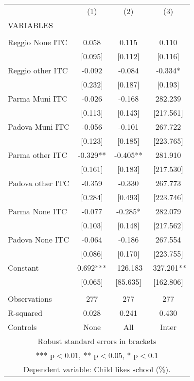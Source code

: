 \begin{tabular}{lccc} \hline
 & (1) & (2) & (3) \\
VARIABLES &  &  &  \\ \hline
 &  &  &  \\
Reggio None ITC & 0.058 & 0.115 & 0.110 \\
 & [0.095] & [0.112] & [0.116] \\
Reggio other ITC & -0.092 & -0.084 & -0.334* \\
 & [0.232] & [0.187] & [0.193] \\
Parma Muni ITC & -0.026 & -0.168 & 282.239 \\
 & [0.113] & [0.143] & [217.561] \\
Padova Muni ITC & -0.056 & -0.101 & 267.722 \\
 & [0.123] & [0.185] & [223.765] \\
Parma other ITC & -0.329** & -0.405** & 281.910 \\
 & [0.161] & [0.183] & [217.530] \\
Padova other ITC & -0.359 & -0.330 & 267.773 \\
 & [0.284] & [0.493] & [223.746] \\
Parma None ITC & -0.077 & -0.285* & 282.079 \\
 & [0.103] & [0.148] & [217.562] \\
Padova None ITC & -0.064 & -0.186 & 267.554 \\
 & [0.086] & [0.170] & [223.755] \\
Constant & 0.692*** & -126.183 & -327.201** \\
 & [0.065] & [85.635] & [162.806] \\
 &  &  &  \\
Observations & 277 & 277 & 277 \\
R-squared & 0.028 & 0.241 & 0.430 \\
 Controls & None & All & Inter \\ \hline
\multicolumn{4}{c}{ Robust standard errors in brackets} \\
\multicolumn{4}{c}{ *** p$<$0.01, ** p$<$0.05, * p$<$0.1} \\
\multicolumn{4}{c}{ Dependent variable: Child likes school (\%).} \\
\end{tabular}
